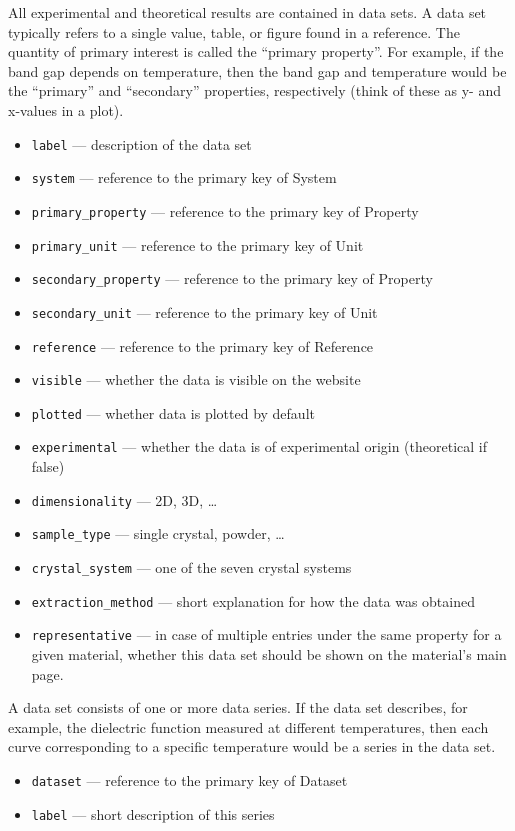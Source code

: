 \documentclass{article}
\begin{document}
All experimental and theoretical results are contained in data sets. A data set typically refers to a single value, table, or figure found in a reference. The quantity of primary interest is called the ``primary property''. For example, if the band gap depends on temperature, then the band gap and temperature would be the ``primary'' and ``secondary'' properties, respectively (think of these as y- and x-values in a plot).
\begin{tcolorbox}[colback=green!5,colframe=green!40!black,title=Dataset(Base)]
  \begin{itemize}
  \item \texttt{label} --- description of the data set
  \item \texttt{system} --- reference to the primary key of System
  \item \texttt{primary\_property} --- reference to the primary key of Property
  \item \texttt{primary\_unit} --- reference to the primary key of Unit
  \item \texttt{secondary\_property} --- reference to the primary key of Property
  \item \texttt{secondary\_unit} --- reference to the primary key of Unit
  \item \texttt{reference} --- reference to the primary key of Reference
  \item \texttt{visible} --- whether the data is visible on the website
  \item \texttt{plotted} --- whether data is plotted by default
  \item \texttt{experimental} --- whether the data is of experimental origin (theoretical if false)
  \item \texttt{dimensionality} --- 2D, 3D, \ldots
  \item \texttt{sample\_type} --- single crystal, powder, \ldots
  \item \texttt{crystal\_system} --- one of the seven crystal systems
  \item \texttt{extraction\_method} --- short explanation for how the data was obtained
  \item \texttt{representative} --- in case of multiple entries under the same property for a given material, whether this data set should be shown on the material's main page.
  \end{itemize}
\end{tcolorbox}

A data set consists of one or more data series. If the data set describes, for example, the dielectric function measured at different temperatures, then each curve corresponding to a specific temperature would be a series in the data set.
\begin{tcolorbox}[colback=green!5,colframe=green!40!black,title=Dataseries(Base)]
  \begin{itemize}
  \item \texttt{dataset} --- reference to the primary key of Dataset
  \item \texttt{label} --- short description of this series
  \end{itemize}
\end{tcolorbox}
\end{document}
